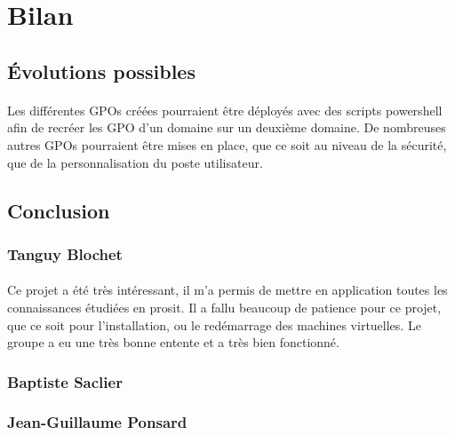 \section{Bilan}
	\subsection{Évolutions possibles}
		\paragraph{}
			Les différentes GPOs créées pourraient être déployés avec des scripts powershell afin de recréer les GPO d'un domaine sur un deuxième domaine. De nombreuses autres GPOs pourraient être mises en place, que ce soit au niveau de la sécurité, que de la personnalisation du poste utilisateur.
	\subsection{Conclusion}
		\subsubsection{Tanguy Blochet}
			\paragraph{}
				Ce projet a été très intéressant, il m'a permis de mettre en application toutes les connaissances étudiées en prosit. Il a fallu beaucoup de patience pour ce projet, que ce soit pour l'installation, ou le redémarrage des machines virtuelles. Le groupe a eu une très bonne entente et a très bien fonctionné.
		\subsubsection{Baptiste Saclier}
			\paragraph{}

		\subsubsection{Jean-Guillaume Ponsard}	
			\paragraph{}
